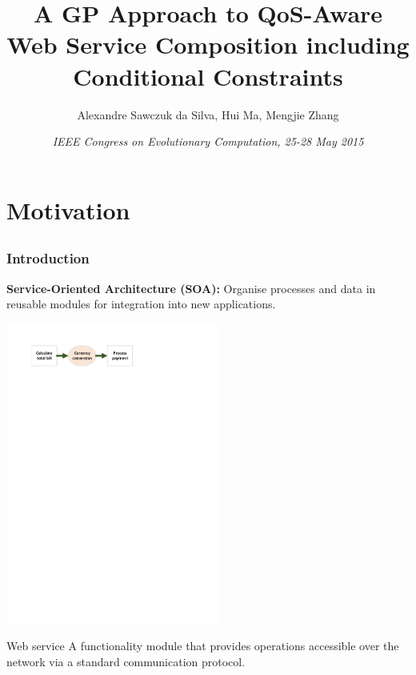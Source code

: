 \documentclass[xcolor={table}]{beamer}
\title[A GP Approach to QoS-Aware Web Service Composition including Conditional Constraints]{A GP Approach to QoS-Aware Web Service Composition including Conditional Constraints} %
\author{Alexandre Sawczuk da Silva, Hui Ma, Mengjie Zhang} %
\institute[Victoria University of Wellington] %
{
\textbf{Evolutionary Computation Research Group}\\
School of Engineering and Computer Science, Victoria University of Wellington \\ %
}
\date{\footnotesize \textit{IEEE Congress on Evolutionary Computation, 25-28 May 2015}}
\begin{document}
\begin{frame}
\titlepage %
\end{frame}



\section{Motivation} %
\subsection{} %

\begin{frame}
\frametitle{Introduction}
\textbf{Service-Oriented Architecture (SOA):} Organise processes and data in reusable modules for integration into new applications.
\vfill
\centerline{\includegraphics[width=7cm]{currency_example.pdf}}
\vfill
\begin{block}{Web service}
A functionality module that provides operations accessible over the network via a standard communication protocol.
\end{block}
\end{frame}
\end{document}
